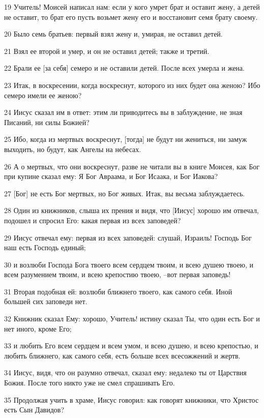 \par 19 Учитель! Моисей написал нам: если у кого умрет брат и оставит жену, а детей не оставит, то брат его пусть возьмет жену его и восстановит семя брату своему.
\par 20 Было семь братьев: первый взял жену и, умирая, не оставил детей.
\par 21 Взял ее второй и умер, и он не оставил детей; также и третий.
\par 22 Брали ее [за себя] семеро и не оставили детей. После всех умерла и жена.
\par 23 Итак, в воскресении, когда воскреснут, которого из них будет она женою? Ибо семеро имели ее женою?
\par 24 Иисус сказал им в ответ: этим ли приводитесь вы в заблуждение, не зная Писаний, ни силы Божией?
\par 25 Ибо, когда из мертвых воскреснут, [тогда] не будут ни жениться, ни замуж выходить, но будут, как Ангелы на небесах.
\par 26 А о мертвых, что они воскреснут, разве не читали вы в книге Моисея, как Бог при купине сказал ему: Я Бог Авраама, и Бог Исаака, и Бог Иакова?
\par 27 [Бог] не есть Бог мертвых, но Бог живых. Итак, вы весьма заблуждаетесь.
\par 28 Один из книжников, слыша их прения и видя, что [Иисус] хорошо им отвечал, подошел и спросил Его: какая первая из всех заповедей?
\par 29 Иисус отвечал ему: первая из всех заповедей: слушай, Израиль! Господь Бог наш есть Господь единый;
\par 30 и возлюби Господа Бога твоего всем сердцем твоим, и всею душею твоею, и всем разумением твоим, и всею крепостию твоею, --вот первая заповедь!
\par 31 Вторая подобная ей: возлюби ближнего твоего, как самого себя. Иной большей сих заповеди нет.
\par 32 Книжник сказал Ему: хорошо, Учитель! истину сказал Ты, что один есть Бог и нет иного, кроме Его;
\par 33 и любить Его всем сердцем и всем умом, и всею душею, и всею крепостью, и любить ближнего, как самого себя, есть больше всех всесожжений и жертв.
\par 34 Иисус, видя, что он разумно отвечал, сказал ему: недалеко ты от Царствия Божия. После того никто уже не смел спрашивать Его.
\par 35 Продолжая учить в храме, Иисус говорил: как говорят книжники, что Христос есть Сын Давидов?
